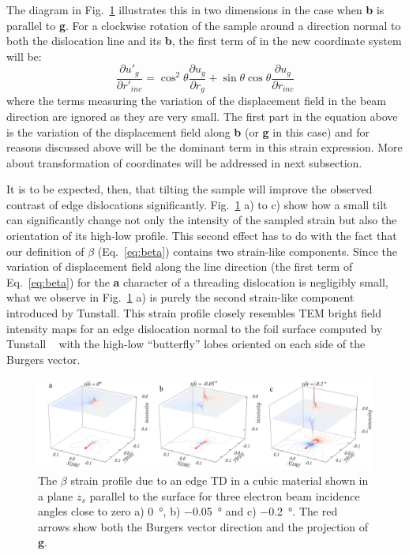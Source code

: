 The diagram in Fig.~\ref{fig:tilting_eff} illustrates this in two dimensions in the case when \textbf{b} is parallel to\textbf{ g}. For a clockwise rotation of the sample around a direction normal to both the dislocation line and its \textbf{b}, the first term of in the new coordinate system will be:
\begin{equation*}
    \frac{\partial u'_g}{\partial r'_{inc}} = \cos^2{\theta}  \frac{\partial u_g}{\partial r_{g}} + \sin{\theta} \cos{\theta}  \frac{\partial u_g}{\partial r_{inc}}
\end{equation*}
where the terms measuring the variation of the displacement field in the beam direction are ignored as they are
very small. The first part in the equation above is the variation of the displacement field along \textbf{b} (or \textbf{g} in this case) and for reasons discussed above will be the dominant term in this strain expression. More about transformation of coordinates will be addressed in next subsection.



It is to be expected, then, that tilting the sample will improve the observed contrast of edge dislocations significantly. Fig.~\ref{fig:tilting_eff}  a) to c) show how a small tilt can significantly change not only the intensity of the sampled strain but also the orientation of its high-low profile. This second effect has to do with the fact that our definition of $\beta$ (Eq.~\ref{eq:beta}) contains two strain-like components. Since the variation of displacement field along the line direction  (the first term of Eq.~\ref{eq:beta}) for the \textbf{a} character of a threading dislocation is negligibly small, what we observe in Fig.~\ref{fig:tilting_eff} a) is purely the second strain-like component introduced by Tunstall. This strain profile closely resembles TEM bright field intensity maps for an edge dislocation normal to the foil surface computed by Tunstall \etal~\cite{Tunstall64}  with the high-low ``butterfly'' lobes oriented on each side of the Burgers vector.

\begin{figure}
    \centering
    \includegraphics[width=1.1\linewidth]{Figures/tilting_effect.png}
    \caption[Planar edge TD $\beta$ strain profile. ]{The $\beta$ strain profile due to an edge TD in a cubic material shown in a plane $z_s$ parallel to the surface for three electron beam incidence angles close to zero a) \SI{0}{\degree}, b) \SI{-0.05}{\degree} and c) \SI{-0.2}{\degree}. The red arrows show both the Burgers vector direction and the projection of \textbf{g}.}
    \label{fig:tilting_eff}
\end{figure}


